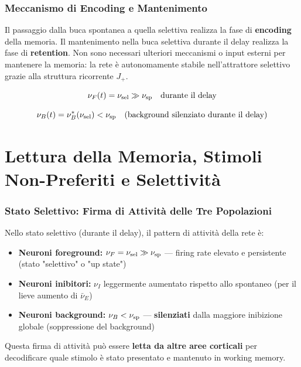 \subsubsection{Meccanismo di Encoding e Mantenimento}

Il passaggio dalla buca spontanea a quella selettiva realizza la fase di \textbf{encoding} della memoria. Il mantenimento nella buca selettiva durante il delay realizza la fase di \textbf{retention}. Non sono necessari ulteriori meccanismi o input esterni per mantenere la memoria: la rete è autonomamente stabile nell'attrattore selettivo grazie alla struttura ricorrente $J_+$.

\begin{equation}
\nu_F(t) = \nu_{\rm sel} \gg \nu_{\rm sp} \quad \text{durante il delay}
\end{equation}

\begin{equation}
\nu_B(t) = \nu_B^*(\nu_{\rm sel}) < \nu_{\rm sp} \quad \text{(background silenziato durante il delay)}
\end{equation}



\section{Lettura della Memoria, Stimoli Non-Preferiti e Selettività}

\subsubsection{Stato Selettivo: Firma di Attività delle Tre Popolazioni}

Nello stato selettivo (durante il delay), il pattern di attività della rete è:

\begin{itemize}
    \item \textbf{Neuroni foreground:} $\nu_F = \nu_{\rm sel} \gg \nu_{\rm sp}$ — firing rate elevato e persistente (stato "selettivo" o "up state")
    \item \textbf{Neuroni inibitori:} $\nu_I$ leggermente aumentato rispetto allo spontaneo (per il lieve aumento di $\bar{\nu}_E$)
    \item \textbf{Neuroni background:} $\nu_B < \nu_{\rm sp}$ — \textbf{silenziati} dalla maggiore inibizione globale (soppressione del background)
\end{itemize}

Questa firma di attività può essere \textbf{letta da altre aree corticali} per decodificare quale stimolo è stato presentato e mantenuto in working memory.


